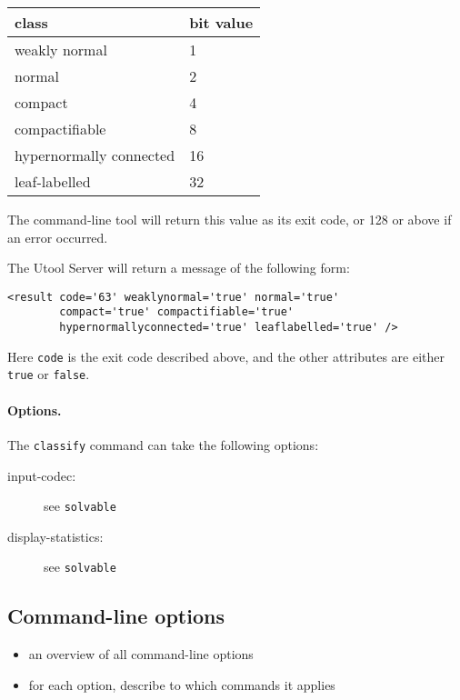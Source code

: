 \begin{center}
\begin{tabular}{l|l}
class & bit value \\ \hline
weakly normal & 1 \\
normal & 2 \\
compact & 4 \\
compactifiable & 8 \\
hypernormally connected & 16 \\
leaf-labelled & 32
\end{tabular}
\end{center}

The command-line tool will return this value as its exit code, or 128
or above if an error occurred.

The Utool Server will return a message of the following form:
\begin{verbatim}
<result code='63' weaklynormal='true' normal='true'
        compact='true' compactifiable='true'
        hypernormallyconnected='true' leaflabelled='true' />
\end{verbatim}

Here \verb?code? is the exit code described above, and the other
attributes are either \verb?true? or \verb?false?.


\paragraph{Options.}
The \verb?classify? command can take the following options:
\begin{description}
\item[input-codec:] see \verb?solvable? 
\item[display-statistics:] see \verb?solvable?
\end{description}



\subsection{Command-line options}

\begin{itemize}
\item an overview of all command-line options
\item for each option, describe to which commands it applies 
\end{itemize}




